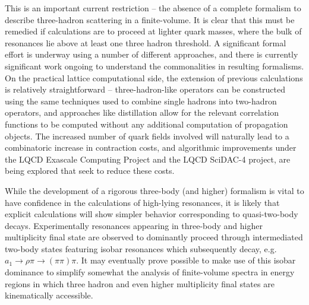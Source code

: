 This is an important current restriction -- the absence of a complete formalism to describe three-hadron scattering in a finite-volume. It is clear that this must be remedied if calculations are to proceed at lighter quark masses, where the bulk of resonances lie above at least one three hadron threshold. A significant formal effort is underway\cite{Polejaeva:2012ut,Hansen:2015zga,Hansen:2014eka,Briceno:2018aml,Doring:2018xxx} using a number of different approaches, and there is currently significant work ongoing to understand the commonalities in resulting formalisms. On the practical lattice computational side, the extension of previous calculations is relatively straightforward -- three-hadron-like operators can be constructed using the same techniques used to combine single hadrons into two-hadron operators, and approaches like distillation allow for the relevant correlation functions to be computed without any additional computation of propagation objects. The increased number of quark fields involved will naturally lead to a combinatoric increase in contraction costs, and algorithmic improvements under the LQCD Exascale Computing Project and the LQCD SciDAC-4 project, are being explored that seek to reduce these costs.

While the development of a rigorous three-body (and higher) formalism is vital to have confidence in the calculations of high-lying resonances, it is likely that explicit calculations will show simpler behavior corresponding to quasi-two-body decays. Experimentally resonances appearing in three-body and higher multiplicity final state are observed to dominantly proceed through intermediated two-body states featuring isobar resonances which subsequently decay, e.g. $a_1 \to \rho \pi \to (\pi\pi) \pi$. It may eventually prove possible to make use of this isobar dominance to simplify somewhat the analysis of finite-volume spectra in energy regions in which three hadron and even higher multiplicity final states are kinematically accessible.


